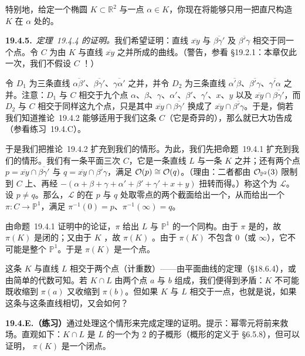 特别地，给定一个椭圆 $K\subset\mathbb{R}^2$ 与一点 $\alpha\in K$，你现在将能够只用一把直尺构造 $K$ 在 $\alpha$ 处的\trTangentLine。

\textbf{19.4.5.}\ \emph{\mbox{\trPascal{}定理~19.4.4} 的证明。}\quad 我们希望证明：直线 $\overline{xy}$ 与 $\overline{\beta\gamma'}$ 及 $\overline{\beta'\gamma}$ 相交于同一个点。令 $C$ 为由 $K$ 与直线 $\overline{xy}$ 之并所成的曲线。（警告，参看 \S19.2.1：本章仅此一次，我们不假设 $C$ \trRegular！）

令 $D_1$ 为三条直线 $\overline{\alpha\beta'}$、$\overline{\beta\gamma'}$、$\overline{\gamma\alpha'}$ 之并，并令 $D_2$ 为三条直线 $\overline{\alpha'\beta}$、$\overline{\beta'\gamma}$、$\overline{\gamma'\alpha}$ 之并。注意：$D_1$ 与 $C$ 相交于九个点 $\alpha$、$\beta$、$\gamma$、$\alpha'$、$\beta'$、$\gamma'$、$x$、$y$ 以及 $\overline{xy}\cap\overline{\beta\gamma'}$，而 $D_2$ 与 $C$ 相交于同样这九个点，只是其中 $\overline{xy}\cap\overline{\beta\gamma'}$ 换成了 $\overline{xy}\cap\overline{\beta'\gamma}$。于是，倘若我们知道\mbox{推论~19.4.2} 能够适用于我们这条 $C$（它是奇异的），那么就已大功告成（参看\mbox{练习~19.4.C}）。

于是我们把\mbox{推论~19.4.2} 扩充到我们的情形。为此，我们先把\mbox{命题~19.4.1} 扩充到我们的情形。我们有一条平面三次\trCurve{} $C$，它是一条直线 $L$ 与一条\trConic{} $K$ 之并；还有两个点 $p=\overline{xy}\cap\overline{\beta\gamma'}$ 与 $q=\overline{xy}\cap\overline{\beta'\gamma}$，满足 $\mathcal{O}(p)\cong\mathcal{O}(q)$。（理由：二者都由 $\mathcal{O}_{\mathbb{P}^2}(3)$ 限制到 $C$ 上、再经 $-(\alpha+\beta+\gamma+\alpha'+\beta'+\gamma'+x+y)$ 扭转而得。）称这个\trInvertibleSheaf{}为 $\mathscr{L}$。设 $p\ne q$。那么，$\mathscr{L}$ 的在 $p$ 与 $q$ 处取零点的两个截面给出一个\trBasePointFree\trLinearSystem，从而给出一个\trMorphism{} $\pi\colon C\to\mathbb{P}^1$，满足 $\pi^{-1}(0)=p$、$\pi^{-1}(\infty)=q$。

由\mbox{命题~19.4.1} 证明中的论证，$\pi$ 给出 $L$ 与 $\mathbb{P}^1$ 的一个同构。由于 $\pi$ 是\trProper{}的，故 $\pi(K)$ 是闭的；又由于 $K$ \trIrreducible，故 $\pi(K)$ \trIrreducible。由于 $\pi(K)$ 不包含 $0$（或 $\infty$），它不可能是整个 $\mathbb{P}^1$。于是 $\pi(K)$ 是一个点。

这条\trConic{} $K$ 与直线 $L$ 相交于两个点（计重数）——由平面曲线的\trBezout{}定理（\S18.6.4），或由简单的代数可知。若 $K\cap L$ 由两个点 $a$ 与 $b$ 组成，我们便得到矛盾：$K$ 不可能既收缩到 $\pi(a)$ 又收缩到 $\pi(b)$。但如果 $K$ 与 $L$ 相交于一点，也就是说，如果这条\trConic{}与这条直线相切，又会如何？

\textbf{19.4.E.（练习）}\quad 通过处理这个情形来完成\trPascal{}定理的证明。提示：幂零元将前来救场。直观如下：$K\cap L$ 是 $L$ 的一个\trLength{}为 $2$ 的子概形（概形的\trLength{}定义于 \S6.5.8），但可以证明，\trSchemeTheoreticImage{} $\pi(K)$ 是一个\trReduced{}闭点。

